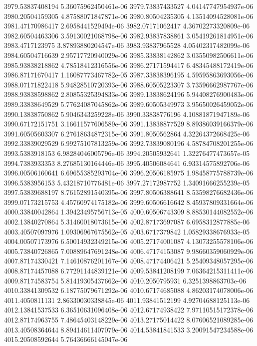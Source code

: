 {3979.53837408194 5.36075962450461e-06
3979.73837433527 4.04147747954937e-06
3980.20504159305 4.87588071847871e-06
3980.80504235305 4.13514094528081e-06
3981.47170986417 2.6958441529494e-06
3982.07171062417 4.36702273320809e-06
3982.60504463306 3.59130021068798e-06
3982.93837838861 3.05419261814951e-06
3983.4717123975 3.87893880204547e-06
3983.93837965528 4.05402317482099e-06
3984.60504716639 2.95717720940029e-06
3985.33838142862 3.03550982506611e-06
3985.93838218862 4.78518412316556e-06
3986.27171594417 6.48345488172419e-06
3986.87171670417 1.16087773467782e-05
3987.33838396195 4.59595863693056e-06
3988.07171822418 5.94828510720393e-06
3988.60505223307 3.73596662987767e-06
3988.93838598862 2.80855325394833e-06
3989.13838624196 5.94408276900483e-06
3989.33838649529 5.77624087045862e-06
3989.60505349973 3.95650026459052e-06
3990.13838750862 5.9046343259228e-06
3990.33838776196 4.10881871947189e-06
3990.67172151751 3.16611577606589e-06
3991.13838877529 8.89386039166379e-06
3991.60505603307 6.27618634872315e-06
3991.8050562864 4.32264372668425e-06
3992.33839029529 6.99275107813259e-06
3992.73839080196 4.58784708201255e-06
3993.5383918153 6.98284046005796e-06
3994.20505932641 1.32276477473657e-05
3994.7383933353 8.27685130164446e-06
3995.40506084641 6.93314575892706e-06
3996.00506160641 6.69655385293704e-06
3996.20506185975 1.98458775788739e-06
3996.5383956153 5.43218710776481e-06
3997.27172987752 1.34091666255239e-05
3997.53839688197 8.76152891540395e-06
3997.80506388641 8.53598276682436e-06
3999.07173215753 4.45760974175182e-06
3999.60506616642 8.45937809331664e-06
4000.33840042864 1.39423495756713e-05
4000.60506743309 8.88530144082552e-06
4002.13840270864 5.31460018073615e-06
4002.87173697087 6.6958312877885e-06
4003.40507097976 1.09306967675562e-05
4003.6717379842 1.05829338676933e-05
4004.00507173976 6.50014932349215e-06
4005.27174001087 4.13073255578106e-06
4005.73840726865 7.00889647691248e-06
4006.47174153087 9.98660359060929e-06
4007.87174330421 7.14610876201167e-06
4008.47174406421 5.25409348057295e-06
4008.87174457088 6.77291144839121e-06
4009.53841208199 7.06364215311411e-06
4009.87174583754 5.81419305437662e-06
4010.2050795931 6.3251398863703e-06
4010.33841309532 6.18775079671292e-06
4010.67174685088 4.86203174078006e-06
4011.4050811131 2.86330030338845e-06
4011.93841512199 4.92704688125113e-06
4012.13841537533 6.36510631096408e-06
4012.67174938422 7.97110515172378e-06
4012.87174963755 7.48645403148229e-06
4013.27175014422 8.07606521089285e-06
4013.40508364644 8.89414611407079e-06
4014.53841841533 3.20091547234588e-06
4015.20508592644 5.76436666145047e-06
}
